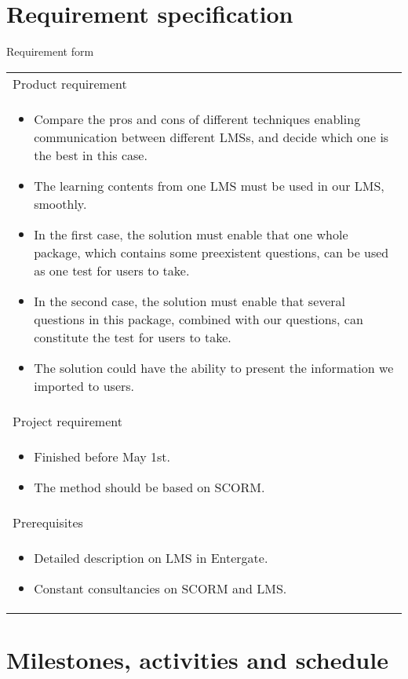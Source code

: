 \documentclass{report}
\begin{document}
\newpage
\section{Requirement specification}
Requirement form \\
\begin{table}[h]
	\begin{tabular}{| p{15cm} |}
		\hline
		Product requirement \\
		\begin{itemize}
			\item
				Compare the pros and cons of different techniques enabling communication between different LMSs, and decide which one is the best in 
				this case.
			\item
				The learning contents from one LMS must be used in our LMS, smoothly.
			\item
				In the first case, the solution must enable that one whole package, which contains some preexistent questions, can be used as one test
				for users to take.
			\item
				In the second case, the solution must enable that several questions in this package, combined with our questions, can constitute the 
				test for users to take.
			\item
				The solution could have the ability to present the information we imported to users.
		\end{itemize}
		\\

		\hline
		Project requirement \\
		\begin{itemize}
			\item
				Finished before May 1st.
			\item
				The method should be based on SCORM.
		\end{itemize}
		\\
		\hline
		Prerequisites \\
		\begin{itemize}
			\item
				Detailed description on LMS in Entergate.
			\item
				Constant consultancies on SCORM and LMS.
		\end{itemize}
		\\
		\hline
	\end{tabular}
\end{table}

\section{Milestones, activities and schedule}
\end{document}
